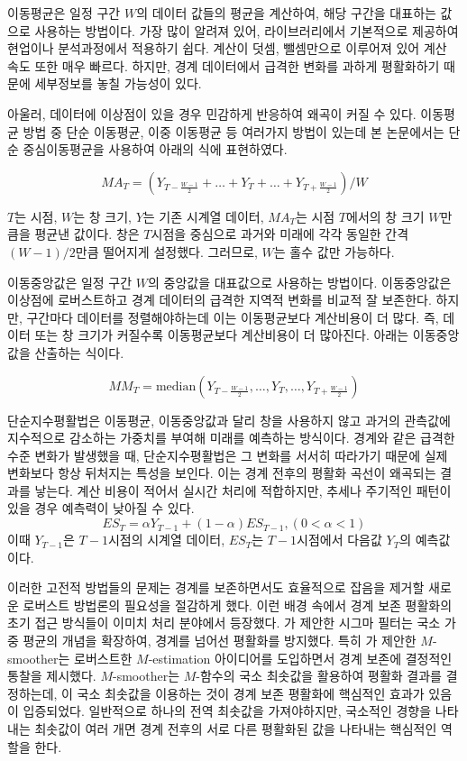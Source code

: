 \documentclass[letterpaper,12pt]{article}
\begin{document}
{이동평균은 일정 구간 $W$의 데이터 값들의 평균을 계산하여, 해당 구간을 대표하는 값으로 사용하는 방법이다. 가장 많이 알려져 있어, 라이브러리에서 기본적으로 제공하여 현업이나 분석과정에서 적용하기 쉽다. 계산이 덧셈, 뺄셈만으로 이루어져 있어 계산 속도 또한 매우 빠르다. 하지만, 경계 데이터에서 급격한 변화를 과하게 평활화하기 때문에 세부정보를 놓칠 가능성이 있다.


아울러, 데이터에 이상점이 있을 경우 민감하게 반응하여 왜곡이 커질 수 있다. 이동평균 방법 중 단순 이동평균, 이중 이동평균 등 여러가지 방법이 있는데 본 논문에서는 단순 중심이동평균을 사용하여 아래의 식에 표현하였다.

\[
MA_T = (Y_{T - \frac{W-1}{2}} + \dots + Y_T +\dots + Y_{T + \frac{W-1}{2}})/W
\]

$T$는 시점, $W$는 창 크기, $Y$는 기존 시계열 데이터, $MA_T$는 시점 $T$에서의 창 크기 $W$만큼을 평균낸 값이다. 창은 $T$시점을 중심으로 과거와 미래에 각각 동일한 간격 $(W-1)/2$만큼 떨어지게 설정했다. 그러므로, $W$는 홀수 값만 가능하다.

이동중앙값은 일정 구간 $W$의 중앙값을 대표값으로 사용하는 방법이다. 이동중앙값은 이상점에 로버스트하고 경계 데이터의 급격한 지역적 변화를 비교적 잘 보존한다. 하지만, 구간마다 데이터를 정렬해야하는데 이는 이동평균보다 계산비용이 더 많다. 즉, 데이터 또는 창 크기가 커질수록 이동평균보다 계산비용이 더 많아진다. 아래는 이동중앙값을 산출하는 식이다.

\[
MM_T = \mbox{median}(Y_{T - \frac{W-1}{2}} , \dots , Y_T , \dots , Y_{T + \frac{W-1}{2}})
\]

단순지수평활법은 이동평균, 이동중앙값과 달리 창을 사용하지 않고 과거의 관측값에 지수적으로 감소하는 가중치를 부여해 미래를 예측하는 방식이다. 경계와 같은 급격한 수준 변화가 발생했을 때, 단순지수평활법은 그 변화를 서서히 따라가기 때문에 실제 변화보다 항상 뒤처지는 특성을 보인다. 이는 경계 전후의 평활화 곡선이 왜곡되는 결과를 낳는다. 계산 비용이 적어서 실시간 처리에 적합하지만, 추세나 주기적인 패턴이 있을 경우 예측력이 낮아질 수 있다.
\[
ES_T= \alpha Y_{T-1} +(1-\alpha)ES_{T-1} , (0<\alpha<1)
\]
이때 $Y_{T-1}$은 $T-1$시점의 시계열 데이터, $ES_T$는 $T-1$시점에서 다음값 $Y_T$의 예측값이다. 

이러한 고전적 방법들의 문제는 경계를 보존하면서도 효율적으로 잡음을 제거할 새로운 로버스트 방법론의 필요성을 절감하게 했다. 이런 배경 속에서 경계 보존 평활화의 초기 접근 방식들이 이미치 처리 분야에서 등장했다. 
\cite{lee1983digital}가 제안한 시그마 필터는 국소 가중 평균의 개념을 확장하여, 경계를 넘어선 평활화를 방지했다. 특히 \cite{chu1998edge}가 제안한 $M$-smoother는 로버스트한 $M$-estimation 아이디어를 도입하면서 경계 보존에 결정적인 통찰을 제시했다. $M$-smoother는 $M$-함수의 국소 최솟값을 활용하여 평활화 결과를 결정하는데, 이 국소 최솟값을 이용하는 것이 경계 보존 평활화에 핵심적인 효과가 있음이 입증되었다. 일반적으로 하나의 전역 최솟값을 가져야하지만, 국소적인 경향을 나타내는 최솟값이 여러 개면 경계 전후의 서로 다른 평활화된 값을 나타내는 핵심적인 역할을 한다.

}
\end{document}
